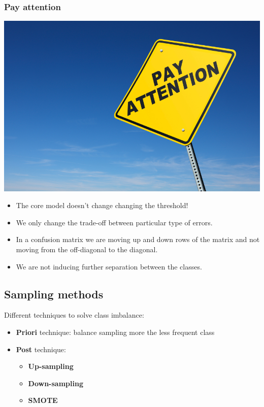 \documentclass[9pt]{beamer}
\begin{document}
\begin{frame}
\frametitle{Pay attention}
\begin{center}
\includegraphics[scale=0.8]{images/payattention.jpeg}
\end{center}
\vspace{3mm}
\begin{itemize}
\item<1->  The core model doesn't change changing the threshold!
\item<2->  We only change the trade-off between particular type of errors.
\item<3->  In a confusion matrix we are moving up and down rows of the matrix and not moving from the off-diagonal to the diagonal.
\item<4->  We are not inducing further separation between the classes.

\end{itemize}
\end{frame}
\subsection{Sampling methods}
\begin{frame}
Different techniques to solve class imbalance:
\begin{itemize}
\item<1->  \textbf{Priori} technique: balance sampling more the less frequent class
\item<2->  \textbf{Post} technique: \begin{itemize}
\item<3->  \textbf{Up-sampling}
\item<4->  \textbf{Down-sampling}
\item<5->  \textbf{SMOTE}
\end{itemize}
\end{itemize}
\end{frame}
\end{document}
